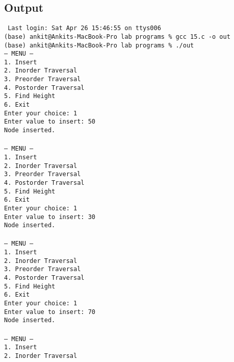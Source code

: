 \documentclass[12pt,a4paper]{article}
\begin{document}
\newpage
\subsection*{Output}
\begin{tcolorbox}[terminalstyle, title=Sample Output]
\texttt{
Last login: Sat Apr 26 15:46:55 on ttys006\\
(base) ankit@Ankits-MacBook-Pro lab programs \% gcc 15.c -o out\\
(base) ankit@Ankits-MacBook-Pro lab programs \% ./out\\
--- MENU ---\\
1. Insert\\
2. Inorder Traversal\\
3. Preorder Traversal\\
4. Postorder Traversal\\
5. Find Height\\
6. Exit\\
Enter your choice: 1\\
Enter value to insert: 50\\
Node inserted.\\
\\
--- MENU ---\\
1. Insert\\
2. Inorder Traversal\\
3. Preorder Traversal\\
4. Postorder Traversal\\
5. Find Height\\
6. Exit\\
Enter your choice: 1\\
Enter value to insert: 30\\
Node inserted.\\
\\
--- MENU ---\\
1. Insert\\
2. Inorder Traversal\\
3. Preorder Traversal\\
4. Postorder Traversal\\
5. Find Height\\
6. Exit\\
Enter your choice: 1\\
Enter value to insert: 70\\
Node inserted.\\
\\
--- MENU ---\\
1. Insert\\
2. Inorder Traversal\\
}
\end{tcolorbox}
\end{document}
